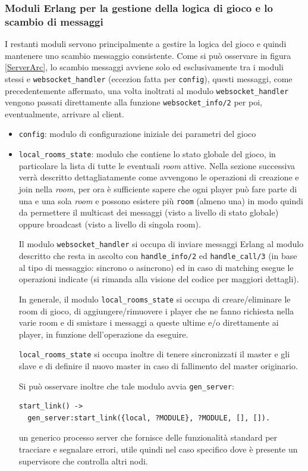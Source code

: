 \documentclass[paper=a4, fontsize=11pt]{scrartcl} %
\numberwithin{equation}{section} %
\numberwithin{figure}{section} %
\numberwithin{table}{section} %
\begin{document}
\subsubsection{Moduli Erlang per la gestione della logica di gioco e lo scambio di messaggi}
I restanti moduli servono principalmente a gestire la logica del gioco e quindi mantenere uno scambio messaggio consistente. Come si può osservare in figura \ref{ServerArc}, lo scambio messaggi avviene solo ed esclusivamente tra i moduli stessi e \texttt{websocket\_handler} (eccezion fatta per \texttt{config}), questi messaggi, come precedentemente affermato, una volta inoltrati al modulo \texttt{websocket\_handler} vengono passati direttamente alla funzione \texttt{websocket\_info/2} per poi, eventualmente, arrivare al client.
\begin{itemize}
\item \texttt{config}: modulo di configurazione iniziale dei parametri del gioco
\item \texttt{local\_rooms\_state}: modulo che contiene lo stato globale del gioco, in particolare la lista di tutte le eventuali \textit{room} attive. Nella sezione successiva verrà descritto dettagliatamente come avvengono le operazioni di creazione e join nella \textit{room}, per ora è sufficiente sapere che ogni player può fare parte di una e una sola \textit{room} e possono esistere più \texttt{room} (almeno una) in modo quindi da permettere il multicast dei messaggi (visto a livello di stato globale) oppure broadcast (visto a livello di singola room).

Il modulo \texttt{websocket\_handler} si occupa di inviare messaggi Erlang al modulo descritto che resta in ascolto con \texttt{handle\_info/2} ed \texttt{handle\_call/3} (in base al tipo di messaggio: sincrono o asincrono) ed in caso di matching esegue le operazioni indicate (si rimanda alla visione del codice per maggiori dettagli).

In generale, il modulo \texttt{local\_rooms\_state} si occupa di creare/eliminare le room di gioco, di aggiungere/rimuovere i player che ne fanno richiesta nella varie room e di smistare i messaggi a queste ultime e/o direttamente ai player, in funzione dell'operazione da eseguire.

\texttt{local\_rooms\_state} si occupa inoltre di tenere sincronizzati il master e gli slave e di definire il nuovo master in caso di fallimento del master originario.


Si può osservare inoltre che tale modulo avvia \texttt{gen\_server}:
\begin{lstlisting}[basicstyle=\footnotesize]
start_link() ->
  gen_server:start_link({local, ?MODULE}, ?MODULE, [], []).
\end{lstlisting}
un generico processo server che fornisce delle funzionalità standard per tracciare e segnalare errori, utile quindi nel caso specifico dove è presente un supervisore che controlla altri nodi.


\end{itemize}
\end{document}
